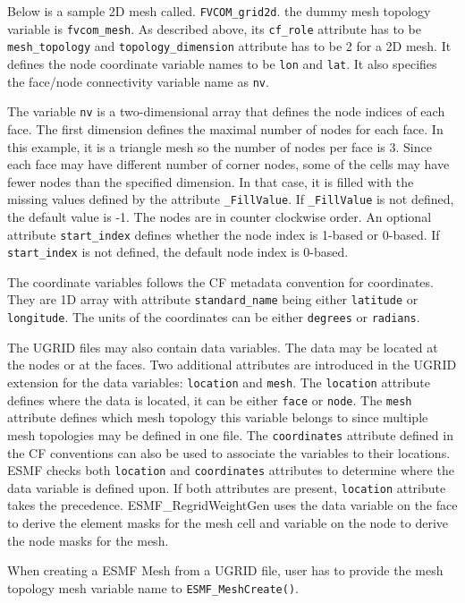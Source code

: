 Below is a sample 2D mesh called. {\tt FVCOM\_grid2d}. the dummy mesh topology variable is {\tt fvcom\_mesh}.  As described above, its {\tt cf\_role} attribute has to be {\tt mesh\_topology}
and {\tt topology\_dimension} attribute has to be 2 for a 2D mesh.  It defines
the node coordinate variable names to be {\tt lon} and {\tt lat}.  It also specifies the face/node connectivity variable name as {\tt nv}.

The variable {\tt nv} is a two-dimensional array that defines the node indices of each face. The first dimension
defines the maximal number of nodes for each face. In this example, it is a
triangle mesh so the number of nodes per face is 3.  Since each face may have different number of corner nodes,
some of the cells may have fewer nodes than the specified dimension. In that case, it is filled with the
missing values defined by the attribute {\tt \_FillValue}.  If {\tt \_FillValue} is not defined, the default value
is -1. The nodes are in counter clockwise order.  An optional attribute
{\tt start\_index} defines whether the node index is 1-based or 0-based.  If {\tt start\_index} is not defined, 
the default node index is 0-based.

The coordinate variables follows the CF metadata convention for coordinates.  They are 1D array with attribute
{\tt standard\_name} being either {\tt latitude} or {\tt longitude}.  The units of the coordinates can be either {\tt degrees} or {\tt radians}.

The UGRID files may also contain data variables.  The data may be located at the nodes or at the faces.  Two additional attributes are introduced in the UGRID extension for the data variables:  {\tt location} and {\tt mesh}.  The {\tt location}
attribute defines where the data is located, it can be either {\tt face} or {\tt node}.  The {\tt mesh} attribute defines which mesh topology this variable belongs to since multiple mesh topologies may be defined in one
file.  The {\tt coordinates} attribute defined in the CF conventions can also be used to associate the variables to their locations.  ESMF checks both {\tt location} and {\tt coordinates} attributes to determine where the data variable is defined upon. If both attributes are present, {\tt location} attribute takes the precedence.  ESMF\_RegridWeightGen uses the data variable on the face to derive the element masks for the mesh cell and variable on the node to derive the node masks for the mesh. 

When creating a ESMF Mesh from a UGRID file, user has to provide the mesh topology mesh variable name to {\tt ESMF\_MeshCreate()}.

